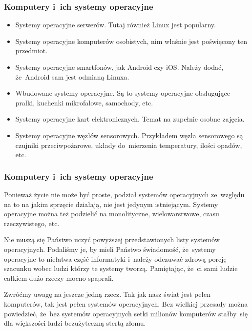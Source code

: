 \documentclass[10pt,t]{beamer}
\begin{document}
\begin{frame}
  \frametitle{Komputery i~ich systemy operacyjne}


  \begin{itemize}

  \item Systemy operacyjne serwerów. Tutaj również Linux jest popularny.

  \item Systemy operacyjne komputerów osobistych, nim właśnie jest
    poświęcony ten przedmiot.

  \item Systemy operacyjne smartfonów, jak Android czy iOS. Należy
    dodać, że~Android sam jest odmianą Linuxa.

  \item Wbudowane systemy operacyjne. Są to systemy operacyjne obsługujące
    pralki, kuchenki mikrofalowe, samochody, etc.

  \item Systemy operacyjne kart elektronicznych. Temat na zupełnie
    osobne zajęcia.

  \item Systemy operacyjne węzłów sensorowych. Przykładem węzła sensorowego
    są czujniki przeciwpożarowe, układy do~mierzenia temperatury, ilości
    opadów, etc.

  \end{itemize}

\end{frame}





\begin{frame}
  \frametitle{Komputery i~ich systemy operacyjne}


  Ponieważ życie nie może być proste, podział systemów operacyjnych
  ze~względu na to na jakim sprzęcie działają, nie jest jedynym
  istniejącym. Systemy operacyjne można też podzielić na monolityczne,
  wielowarstwowe, czasu rzeczywistego, etc.

  \alert{Nie} muszą się Państwo uczyć powyższej przedstawionych listy
  systemów operacyjnych. Podaliśmy je, by mieli Państwo świadomość,
  że~systemy operacyjne to niełatwa część informatyki i~należy odczuwać
  zdrową porcję szacunku wobec ludzi którzy te systemy tworzą. Pamiętając,
  że~ci sami ludzie całkiem dużo rzeczy mocno spaprali.

  Zwróćmy uwagę na jeszcze jedną rzecz. Tak jak nasz świat jest pełen
  komputerów, tak jest pełen systemów operacyjnych. Bez wielkiej przesady
  można powiedzieć, że~bez systemów operacyjnych setki milionów komputerów
  stałby~się dla większości ludzi bezużyteczną stertą złomu.

\end{frame}
\end{document}
